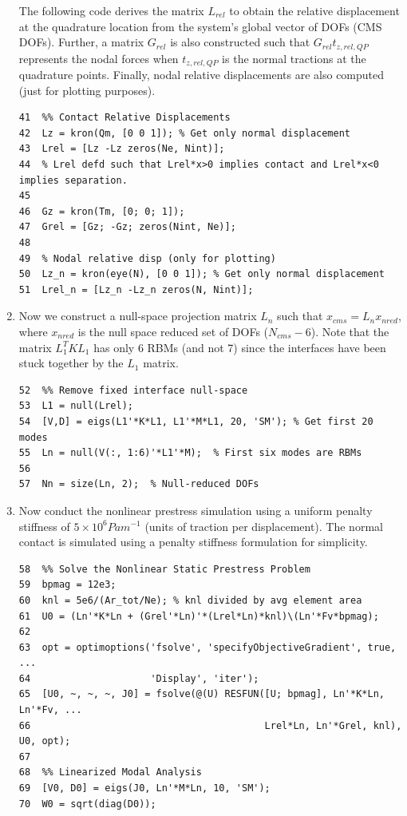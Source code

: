 \documentclass[11pt]{article}
\begin{document}
\begin{enumerate}
The following code derives the matrix \(L_{rel}\) to obtain the relative displacement at the quadrature location from the system's global vector of DOFs (CMS DOFs).
Further, a matrix \(G_{rel}\) is also constructed such that \(G_{rel} t_{z,rel,QP}\) represents the nodal forces when \(t_{z,rel,QP}\) is the normal tractions at the quadrature points.
Finally, nodal relative displacements are also computed (just for plotting purposes).
\begin{verbatim}
41  %% Contact Relative Displacements
42  Lz = kron(Qm, [0 0 1]); % Get only normal displacement
43  Lrel = [Lz -Lz zeros(Ne, Nint)];
44  % Lrel defd such that Lrel*x>0 implies contact and Lrel*x<0 implies separation.
45  
46  Gz = kron(Tm, [0; 0; 1]);
47  Grel = [Gz; -Gz; zeros(Nint, Ne)];
48  
49  % Nodal relative disp (only for plotting)
50  Lz_n = kron(eye(N), [0 0 1]); % Get only normal displacement
51  Lrel_n = [Lz_n -Lz_n zeros(N, Nint)];
\end{verbatim}
\item Now we construct a null-space projection matrix \(L_n\) such that \(x_{cms} = L_n x_{nred}\), where \(x_{nred}\) is the null space reduced set of DOFs (\(N_{cms}-6\)).
Note that the matrix \(L_1^T K L_1\) has only 6 RBMs (and not 7) since the interfaces have been stuck together by the \(L_1\) matrix.
\begin{verbatim}
52  %% Remove fixed interface null-space
53  L1 = null(Lrel);
54  [V,D] = eigs(L1'*K*L1, L1'*M*L1, 20, 'SM'); % Get first 20 modes
55  Ln = null(V(:, 1:6)'*L1'*M);  % First six modes are RBMs
56  
57  Nn = size(Ln, 2);  % Null-reduced DOFs
\end{verbatim}
\item Now conduct the nonlinear prestress simulation using a uniform penalty stiffness of \(5\times 10^6 Pa m^{-1}\) (units of traction per displacement).
The normal contact is simulated using a penalty stiffness formulation for simplicity.
\begin{verbatim}
58  %% Solve the Nonlinear Static Prestress Problem
59  bpmag = 12e3;
60  knl = 5e6/(Ar_tot/Ne); % knl divided by avg element area
61  U0 = (Ln'*K*Ln + (Grel'*Ln)'*(Lrel*Ln)*knl)\(Ln'*Fv*bpmag);
62  
63  opt = optimoptions('fsolve', 'specifyObjectiveGradient', true, ...
64                     'Display', 'iter');
65  [U0, ~, ~, ~, J0] = fsolve(@(U) RESFUN([U; bpmag], Ln'*K*Ln, Ln'*Fv, ...
66                                         Lrel*Ln, Ln'*Grel, knl), U0, opt);
67  
68  %% Linearized Modal Analysis
69  [V0, D0] = eigs(J0, Ln'*M*Ln, 10, 'SM');
70  W0 = sqrt(diag(D0));

\end{verbatim}
\end{enumerate}
\end{document}
